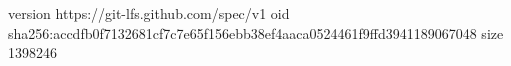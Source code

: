 version https://git-lfs.github.com/spec/v1
oid sha256:accdfb0f7132681cf7c7e65f156ebb38ef4aaca0524461f9ffd3941189067048
size 1398246
